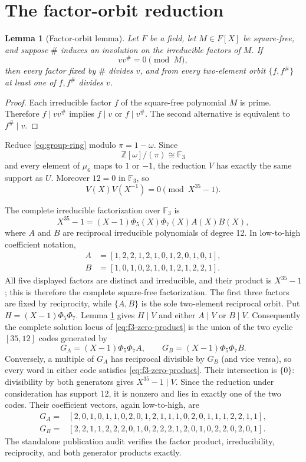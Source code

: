 \documentclass[10pt]{article}
\newtheorem{lemma}{Lemma}
\newcommand{\F}{\mathbb F}
\newcommand{\Z}{\mathbb Z}
\begin{document}
\section{The factor-orbit reduction}

\begin{lemma}[Factor-orbit lemma]\label{lem:factor-orbit}
Let $F$ be a field, let $M\in F[X]$ be square-free, and suppose $\#$ induces
an involution on the irreducible factors of $M$.  If
\[
 vv^\#=0\pmod M,
\]
then every factor fixed by $\#$ divides $v$, and from every two-element orbit
$\{f,f^\#\}$ at least one of $f,f^\#$ divides $v$.
\end{lemma}

\begin{proof}
Each irreducible factor $f$ of the square-free polynomial $M$ is prime.
Therefore $f\mid vv^\#$ implies $f\mid v$ or $f\mid v^\#$.  The second
alternative is equivalent to $f^\#\mid v$.
\end{proof}

Reduce \eqref{eq:group-ring} modulo $\pi=1-\omega$.  Since
\[
 \Z[\omega]/(\pi)\cong\F_3
\]
and every element of $\mu_6$ maps to $1$ or $-1$, the reduction $V$ has
exactly the same support as $U$.  Moreover $12=0$ in $\F_3$, so
\begin{equation}\label{eq:f3-zero-product}
 V(X)V(X^{-1})=0\pmod{X^{35}-1}.
\end{equation}

The complete irreducible factorization over $\F_3$ is
\[
 X^{35}-1=(X-1)\Phi_5(X)\Phi_7(X)A(X)B(X),
\]
where $A$ and $B$ are reciprocal irreducible polynomials of degree 12.  In
low-to-high coefficient notation,
\[
\begin{aligned}
A&=[1,2,2,1,2,1,0,1,2,0,1,0,1],\\
B&=[1,0,1,0,2,1,0,1,2,1,2,2,1].
\end{aligned}
\]
All five displayed factors are distinct and irreducible, and their product is
$X^{35}-1$; this is therefore the complete square-free factorization.  The
first three factors are fixed by reciprocity, while $\{A,B\}$ is the sole
two-element reciprocal orbit.  Put $H=(X-1)\Phi_5\Phi_7$.  Lemma
\ref{lem:factor-orbit} gives $H\mid V$ and either $A\mid V$ or $B\mid V$.
Consequently the complete solution locus of
\eqref{eq:f3-zero-product} is the union of the two cyclic $[35,12]$ codes
generated by
\[
 G_A=(X-1)\Phi_5\Phi_7A,\qquad
 G_B=(X-1)\Phi_5\Phi_7B.
\]
Conversely, a multiple of $G_A$ has reciprocal divisible by $G_B$ (and
vice versa), so every word in either code satisfies
\eqref{eq:f3-zero-product}.
Their intersection is $\{0\}$: divisibility by both generators gives
$X^{35}-1\mid V$.  Since the reduction under consideration has support 12,
it is nonzero and lies in exactly one of the two codes.
Their coefficient vectors, again low-to-high, are
\[
\begin{aligned}
G_A={}&[2,0,1,0,1,1,0,2,0,1,2,1,1,1,0,2,0,1,1,1,2,2,1,1],\\
G_B={}&[2,2,1,1,2,2,2,0,1,0,2,2,2,1,2,0,1,0,2,2,0,2,0,1].
\end{aligned}
\]
The standalone publication audit verifies the factor product,
irreducibility, reciprocity, and both generator products exactly.
\end{document}
